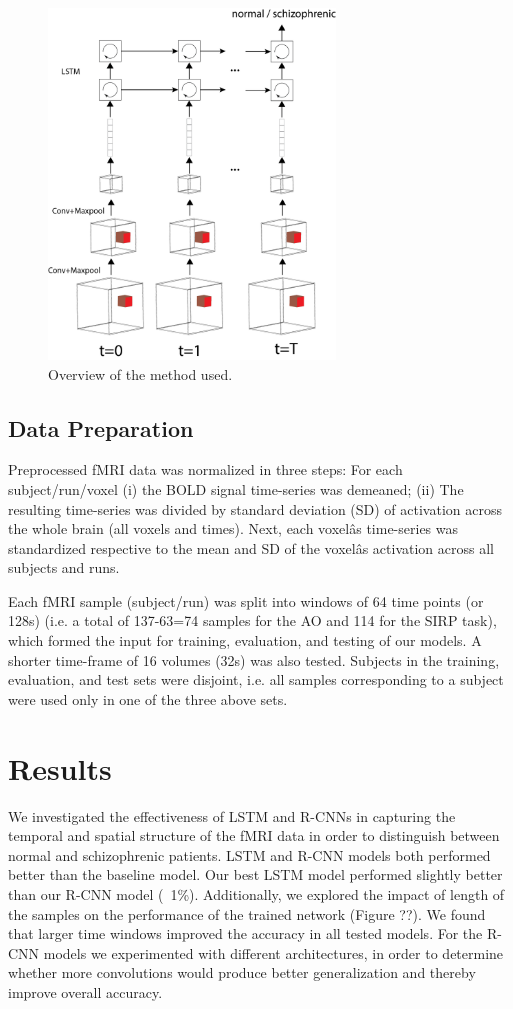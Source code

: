 \documentclass{article}
\begin{document}
\begin{figure}[t]
\begin{center}
\includegraphics[width=3in]{figures/overview.png}
\end{center}
\caption{Overview of the method used.}
\label{fig1}
\end{figure}

\subsection{Data Preparation}
Preprocessed fMRI data was normalized in three steps: For each subject/run/voxel (i) the BOLD signal time-series was demeaned; (ii) The resulting time-series was divided by standard deviation (SD) of activation across the whole brain (all voxels and times). Next, each voxelâs time-series was standardized respective to the mean and SD of the voxelâs activation across all subjects and runs.

Each fMRI sample (subject/run) was split into windows of 64 time points (or 128s) (i.e. a total of 137-63=74 samples for the AO and 114 for the SIRP task), which formed the input for training, evaluation, and testing of our models. A shorter time-frame of 16 volumes (32s) was also tested. Subjects in the training, evaluation, and test sets were disjoint, i.e. all samples corresponding to a subject were used only in one of the three above sets.

\section*{Results}

We investigated the effectiveness of LSTM and R-CNNs in capturing the temporal and spatial structure of the fMRI data in order to distinguish between normal and schizophrenic patients. LSTM and R-CNN models both performed better than the baseline model. Our best LSTM model performed slightly better than our R-CNN model (~1\%). Additionally, we explored the impact of length of the samples on the performance of the trained network (Figure ??). We found that larger time windows improved the accuracy in all tested models. For the R-CNN models we experimented with different architectures, in order to determine whether more convolutions would produce better generalization and thereby improve overall accuracy. 
\end{document}
